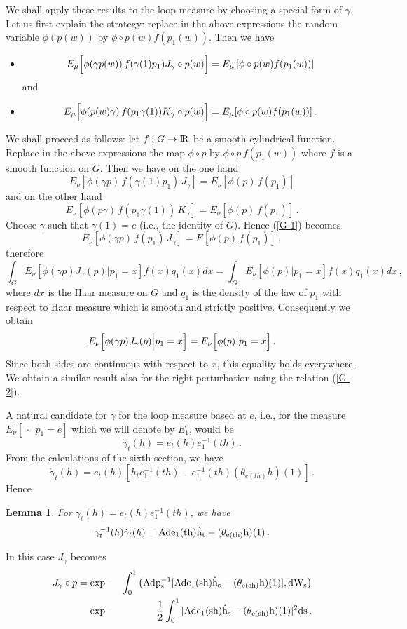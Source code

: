 \documentclass[12pt,a4paper]{book}
\newtheorem{lemma}[theorem]{Lemma}
\newcommand{\Ad}{\rm {Ad}}
\newcommand{\R}{{\rm I\!R}}
\begin{document}
We shall apply these results to the loop measure by choosing a special
form of $\gamma$. Let us first explain the strategy: replace in the
above expressions the random variable
$\phi(p(w))$ by $\phi\circ p(w) f(p_1(w))$. Then we have
\begin{itemize}
\item
$$
E_\mu\Bigl[\phi(\gamma p(w))\,f(\gamma(1)p_1)J_\gamma\circ p(w)\Bigr]=
E_\mu\left[\phi\circ p(w)f(p_1(w))\right]
$$
and
\item
$$
E_\mu\Bigl[\phi( p(w)\gamma)\,f(p_1\gamma(1))K_\gamma\circ p(w)\Bigr]=
E_\mu[\phi\circ p(w)f(p_1(w))]\,.
$$
\end{itemize}
 We shall proceed as follows: let $f:G \rightarrow \R$ be a smooth
cylindrical function. Replace in the above expressions the map $\phi\circ p$ by
$\phi\circ p \,f(p_1(w))$ where $f$ is a smooth function  on $G$. Then we have
 on the  one hand
\begin{equation}
\label{G-1}
E_\nu\left[\phi(\gamma
  p)\,f(\gamma(1)p_1)\,J_\gamma\right]=E_\nu\left[\phi(p)\,f(p_1)\right]
\end{equation}
and on the other hand
\begin{equation}
\label{G-2}
E_\nu\left[\phi(p \gamma
  )\,f(p_1\gamma(1))\,K_\gamma\right]=E_\nu\left[\phi(p)\,f(p_1)\right]\,.
\end{equation}
Choose $\gamma$ such that $\gamma(1)=e$ (i.e., the identity of $G$).
Hence (\ref{G-1}) becomes
$$
E_\nu[\phi(\gamma p)\,f(p_1)\,J_\gamma]=E[\phi(p)\,f(p_1)]\,,
$$
therefore
$$
\int_G E_\nu\left[\phi(\gamma p)J_\gamma(p)\Big|p_1=x\right]f(x) q_1(x) dx =
\int_G E_\nu\left[\phi(p)\Big|p_1=x\right]f(x) q_1(x) dx\,,
$$
where $dx$ is the Haar measure on $G$ and $q_1$ is the density of the law
of $p_1$ with respect to  Haar measure which is smooth and strictly positive.
Consequently we obtain
$$
E_\nu\Bigl[\phi(\gamma
  p)J_\gamma(p)\Big|p_1=x\Bigr]=E_\nu\Bigl[\phi(p)\Big|p_1=x\Bigr]\,.
$$
Since both sides are continuous with respect to $x$, this equality holds
everywhere. We obtain a similar result also for the right perturbation
using the relation (\ref{G-2}).

A natural candidate for $\gamma$ for the loop measure based at $e$,
i.e.,  for  the measure $E_\nu[\,\cdot\,|p_1=e]$ which we will denote by $E_1$,
 would be
$$
\gamma_t(h)=e_t(h)e_1^{-1}(th)\,.
$$
From the calculations of the sixth  section, we have
$$
{\dot{\gamma}}_t(h)=e_t(h)[{\dot{h}}_te^{-1}_1(th)-e_1^{-1}(th)
(\theta_{e(th)}h)(1)]\,.
$$
Hence
\begin{lemma}
For $\gamma_t(h)=e_t(h)e_1^{-1}(th)$, we have
$$
\gamma_t^{-1}(h){\dot{\gamma}}_t(h)=
\Ad e_1(th){\dot{h}}_t-(\theta_{e(th)}h)(1)\,.
$$
\end{lemma}
In this case $J_\gamma$ becomes
\begin{eqnarray*}
J_\gamma\circ p=\exp&-&\int_0^1\left(\Ad p_s^{-1}[\Ad e_1(sh){\dot{h}}_s-
(\theta_{e(sh)}h)(1)],dW_s\right)\\
\exp &-&\frac{1}{2}\int_0^1|\Ad e_1(sh){\dot{h}}_s-(\theta_{e(sh)}h)(1)|^2ds\,.
\end{eqnarray*}
\end{document}
